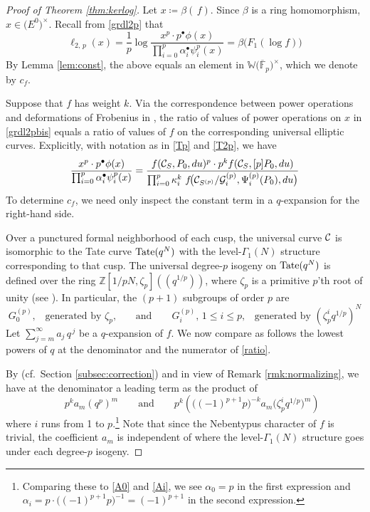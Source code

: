 \documentclass{gtpart}
\theoremstyle{definition}
\theoremstyle{remark}
\newcommand{\mb}[1]{\mathbb{#1}}
\newcommand{\cF}{\overline {\mb F}}
\newcommand{\CC}{{\cal C}}
\newcommand{\CG}{{\cal G}}
\newcommand{\BW}{{\mb W}}
\newcommand{\BZ}{{\mb Z}}
\newcommand{\ad}{\text{and}}
\newcommand{\A}{\alpha}
\newcommand{\B}{\beta}
\newcommand{\G}{\Gamma}
\newcommand{\K}{\kappa}
\newcommand{\ce}{\coloneqq}
\newcommand{\lp}{(\!(}
\newcommand{\rp}{)\!)}
\renewcommand{\=}{\approx}
\renewcommand{\-}{\sim}
\newcommand{\Tate}{{\rm Tate}}
\numberwithin{equation}{section}
\begin{document}
\begin{proof}[Proof of Theorem \ref{thm:kerlog}]
 Let $x \ce \B(\,f)$.  Since $\B$ is a ring homomorphism, 
 $x \in \big( E^0 \big)^{\!\times}$.  Recall from \eqref{grdl2p} that 
 \begin{equation}
  \label{grdl2pbis}
  \ell_{2,\,p}(x) = \frac{1}{p} \log 
  \frac{x^p \cdot p^\bullet \phi(x)}{\prod_{i=0}^p \A_i^\bullet \psi^p_i(x)} = 
  \B \big( F_1(\log f) \big) 
 \end{equation}
 By Lemma \ref{lem:const}, the above equals an element in 
 $\BW \big( \cF_p \big)^{\!\times}$, which we denote by $c_f$.  

 Suppose that $f$ has weight $k$.  Via the correspondence between power 
 operations and deformations of Frobenius in \cite[Theorem B]{cong}, the ratio 
 of values of power operations on $x$ in \eqref{grdl2pbis} equals a ratio of 
 values of $f$ on the corresponding universal elliptic curves.  Explicitly, with 
 notation as in \eqref{Tp} and \eqref{T2p}, we have 
 \begin{equation}
  \label{ratio}
  \frac{x^p \cdot p^\bullet \phi(x)}{\prod_{i=0}^p \A_i^\bullet \psi^p_i(x)} = 
  \frac{f(\CC_S, P_0, du)^p \cdot p^k f(\CC_S, [p] P_0, du)}{\prod_{i=0}^p 
  \K_i^k ~ f\!\big(\CC_{S^{(p)}}/\CG^{(p)}_i, \Psi^{(p)}_i(P_0), du\big)} 
 \end{equation}
 To determine $c_f$, we need only inspect the constant term in a $q$-expansion 
 for the right-hand side.  

 Over a punctured formal neighborhood of each cusp, the universal curve $\CC$ is 
 isomorphic to the Tate curve $\Tate(q^N)$ with the level-$\G_1(N)$ structure 
 corresponding to that cusp.  The universal degree-$p$ isogeny on $\Tate(q^N)$ 
 is defined over the ring $\BZ [1/pN, \zeta_p] \lp q^{1/p} \rp$, where $\zeta_p$ 
 is a primitive $p$'th root of unity (see 
 \cite[Sections 1.2, 1.4, and 1.11]{padicprop}).  In particular, the $(p + 1)$ 
 subgroups of order $p$ are 
 \[
  \text{$G^{(p)}_0$,~~~generated by $\zeta_p$,} \qquad \ad \qquad 
  \text{$G^{(p)}_i$, $1 \leq i \leq p$,~~~generated by $(\zeta_p^i q^{1/p})^N$} 
 \]
 Let $\sum_{j = m}^\infty a_j \, q^{\,j}$ be a $q$-expansion of $f$.  We now 
 compare as follows the lowest powers of $q$ at the denominator and the 
 numerator of \eqref{ratio}.  

 By \cite[(1.11.0.3) and (1.11.0.4)]{padicprop} (cf.~Section 
 \ref{subsec:correction}) and in view of Remark \ref{rmk:normalizing}, we have 
 at the denominator a leading term as the product of 
 \[
  \quad~~ p^k a_m (q^p)^m \qquad \ad 
  \qquad p^k \left(\! \big( (-1)^{p + 1} p \big)^{-k} a_m \big( \zeta_p^i 
  q^{1/p} \big)^m \right) 
 \]
 where $i$ runs from 1 to $p$.\footnote{Comparing these to \eqref{A0} and 
 \eqref{Ai}, we see $\A_0 = p$ in the first expression and 
 $\A_i = p \cdot \big( (-1)^{p + 1} p \big)^{-1} = (-1)^{p + 1}$ in the second 
 expression.  }  Note that since the Nebentypus character of $f$ is trivial, the 
 coefficient $a_m$ is independent of where the level-$\G_1(N)$ structure goes 
 under each degree-$p$ isogeny.  


\end{proof}
\end{document}
